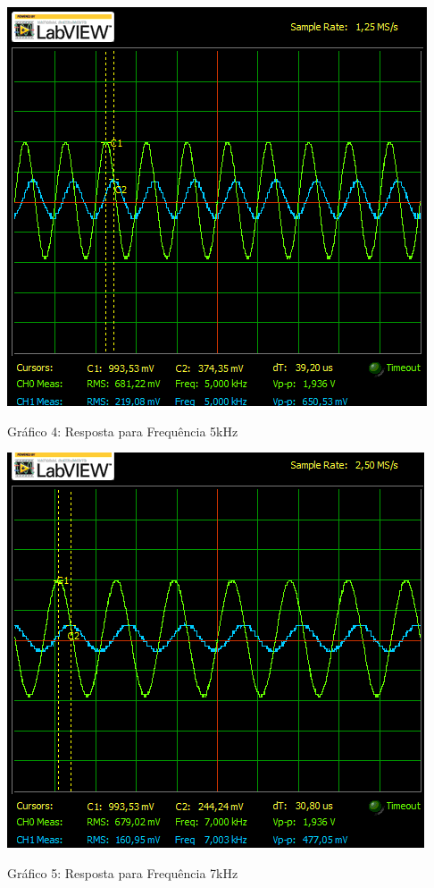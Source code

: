\newpage
\begin{table}[h]
\centering
\includegraphics[scale=0.7]{graficos/RGADICOA5}
\end{table}
\begin{center}
Gráfico 4: Resposta para Frequência 5kHz
\end{center}


\begin{table}[h]
\centering
\includegraphics[scale=0.7]{graficos/RGADICOA7}
\end{table}
\begin{center}
Gráfico 5: Resposta para Frequência 7kHz
\end{center}

